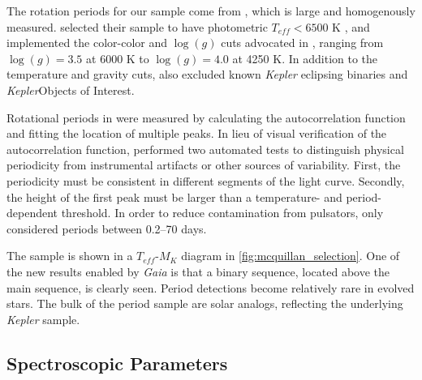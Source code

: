 \documentclass[manuscript]{aastex6}
\newcommand{\Kepler}{\mbox{\textit{Kepler}}}
\newcommand{\Gaia}{\mbox{\textit{Gaia}}}
\newcommand{\Teff}{\ensuremath{T_{eff}}}
\newcommand{\logg}{\ensuremath{\log(g)}}
\begin{document}
The rotation periods for our sample come from \citet{McQuillan14}, which
is large and homogenously measured. \citet{McQuillan14} selected their sample 
to have photometric \(\Teff < 6500\) K \citep{Brown11,Dressing13}, and 
implemented the color-color and \logg{} cuts advocated in \citet{Ciardi11}, 
ranging from \(\logg = 3.5\) at 6000 K to \(\logg = 4.0\) at 4250 K. 
In addition to the temperature and gravity cuts, \citet{McQuillan14} also 
excluded known \Kepler{} eclipsing binaries and \Kepler Objects of Interest. 

Rotational periods in \citet{McQuillan14} were measured by calculating the 
autocorrelation function and fitting the location of multiple peaks. In lieu 
of visual verification of the autocorrelation function, \citet{McQuillan14}
performed two automated tests to distinguish physical periodicity from
instrumental artifacts or other sources of variability. First, the 
periodicity must be consistent in different segments of the light curve.
Secondly, the height of the first peak must be larger than a temperature- and
period-dependent threshold. In order to reduce contamination from pulsators, 
\citet{McQuillan14} only considered periods between 0.2--70 days.

\begin{figure*}[htb]
    \centering
    \caption{\emph{Left:} \Teff-\(M_K\) density plot of the sample of
        \citet{McQuillan14} period detections. A binary sequence is clearly 
        visible above the lower main sequence. The bin size is 100 K in
        temperature and 0.02 mag in K-band absolute magnitude. A 
        representative error bar is shown on the bottom right corner. 
        \emph{Right:} The variation in the \citet{McQuillan14} period 
        detection fraction across the \Teff-\(M_K\) 
    diagram.}\label{fig:mcquillan_selection}
\end{figure*}

The \citet{McQuillan14} sample is shown in a \Teff-\(M_K\)
diagram in \cref{fig:mcquillan_selection}. One of the new results enabled by 
\Gaia{} is that a binary sequence,
located above the main sequence, is clearly seen. Period detections become
relatively rare in evolved stars. The bulk of the period sample are solar
analogs, reflecting the underlying \Kepler{} sample.

\subsection{Spectroscopic Parameters}
\end{document}
